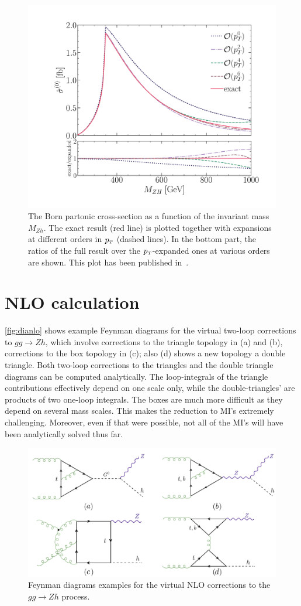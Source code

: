 \begin{figure}[htpb!]
	\centering
	\includegraphics[width=0.75\linewidth]{./figures/LO_ptexp_ratio_1000.pdf}
	\caption{The Born partonic cross-section
		as a function of the invariant mass $M_{Zh}$.
		The exact result (red line) is plotted together with expansions at
		different orders in $p_{\scriptscriptstyle T}$ (dashed lines). In the bottom part,
		the ratios of the full result over the $p_{\scriptscriptstyle T}$-expanded ones at
		various orders are shown. This plot has been published in~\cite{Alasfar:2021ppe}.}
	\label{fig:LO}
\end{figure}
\section{ NLO calculation }
\label{sec:quattro}
\par \autoref{fig:dianlo} shows example Feynman diagrams for the virtual two-loop corrections to $gg \to Zh$, which involve corrections to the triangle topology in (a) and (b), corrections to the box topology in (c); also (d) shows a new topology a double triangle. Both two-loop corrections to the triangles and the double triangle diagrams can be computed analytically. The loop-integrals of the triangle contributions effectively depend on one scale only, while the double-triangles' are products of two one-loop integrals. The boxes are much more difficult as they depend on several mass scales. This makes the reduction to MI's extremely challenging. Moreover, even if that were possible, not all of the MI's will have been analytically solved thus far.
\begin{figure}[htpb!]
	\begin{center}
		\includegraphics[width=12cm]{./figures/Feynman_NL0}
		\caption{Feynman diagrams examples for the virtual NLO corrections to the $gg \to Zh$ process. }
		\label{fig:dianlo}
	\end{center}
\end{figure}
